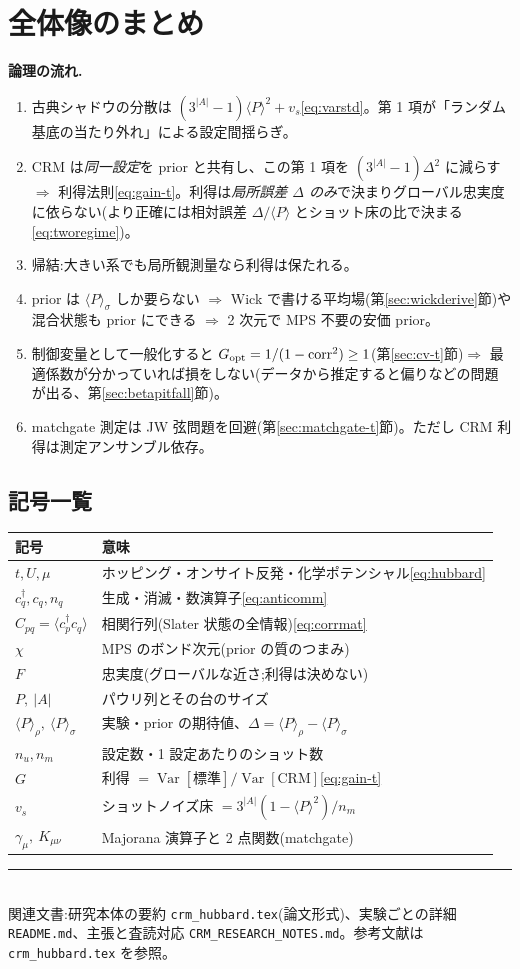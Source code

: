 \documentclass[11pt,a4paper]{ltjsarticle}
\newcommand{\ev}[1]{\langle #1\rangle}
\newcommand{\Var}{\operatorname{Var}}
\newcommand{\cd}{c^\dagger}
\begin{document}
\section{全体像のまとめ}

\begin{keybox}
\textbf{論理の流れ.}
\begin{enumerate}
  \item 古典シャドウの分散は $(3^{|A|}-1)\ev{P}^2+v_s$\eqref{eq:varstd}。第 1 項が「ランダム基底の当たり外れ」による設定間揺らぎ。
  \item CRM は\emph{同一設定}を prior と共有し、この第 1 項を $(3^{|A|}-1)\Delta^2$ に減らす $\Rightarrow$ 利得法則\eqref{eq:gain-t}。利得は\emph{局所誤差 $\Delta$ のみ}で決まりグローバル忠実度に依らない(より正確には相対誤差 $\Delta/\ev{P}$ とショット床の比で決まる\eqref{eq:tworegime})。
  \item 帰結:大きい系でも局所観測量なら利得は保たれる。
  \item prior は $\ev{P}_\sigma$ しか要らない $\Rightarrow$ Wick で書ける平均場(第\ref{sec:wickderive}節)や混合状態も prior にできる $\Rightarrow$ 2 次元で MPS 不要の安価 prior。
  \item 制御変量として一般化すると $G_{\rm opt}=1/(1-\mathrm{corr}^2)\ge1$(第\ref{sec:cv-t}節)$\Rightarrow$ 最適係数が分かっていれば損をしない(データから推定すると偏りなどの問題が出る、第\ref{sec:betapitfall}節)。
  \item matchgate 測定は JW 弦問題を回避(第\ref{sec:matchgate-t}節)。ただし CRM 利得は測定アンサンブル依存。
\end{enumerate}
\end{keybox}

\subsection*{記号一覧}
\begin{center}\small
\begin{tabular}{@{}ll@{}}
\toprule
記号 & 意味 \\
\midrule
$t,U,\mu$ & ホッピング・オンサイト反発・化学ポテンシャル\eqref{eq:hubbard} \\
$\cd_q,c_q,n_q$ & 生成・消滅・数演算子\eqref{eq:anticomm} \\
$C_{pq}=\ev{\cd_pc_q}$ & 相関行列(Slater 状態の全情報)\eqref{eq:corrmat} \\
$\chi$ & MPS のボンド次元(prior の質のつまみ) \\
$F$ & 忠実度(グローバルな近さ;利得は決めない) \\
$P,\ |A|$ & パウリ列とその台のサイズ \\
$\ev{P}_\rho,\ \ev{P}_\sigma$ & 実験・prior の期待値、$\Delta=\ev{P}_\rho-\ev{P}_\sigma$ \\
$n_u,n_m$ & 設定数・1 設定あたりのショット数 \\
$G$ & 利得 $=\Var[\text{標準}]/\Var[\text{CRM}]$\eqref{eq:gain-t} \\
$v_s$ & ショットノイズ床 $=3^{|A|}(1-\ev{P}^2)/n_m$ \\
$\gamma_\mu,\ K_{\mu\nu}$ & Majorana 演算子と 2 点関数(matchgate) \\
\bottomrule
\end{tabular}
\end{center}

\vfill
\noindent\rule{\linewidth}{0.4pt}\\
\footnotesize 関連文書:研究本体の要約 \texttt{crm\_hubbard.tex}(論文形式)、実験ごとの詳細 \texttt{README.md}、主張と査読対応 \texttt{CRM\_RESEARCH\_NOTES.md}。参考文献は \texttt{crm\_hubbard.tex} を参照。
\end{document}
